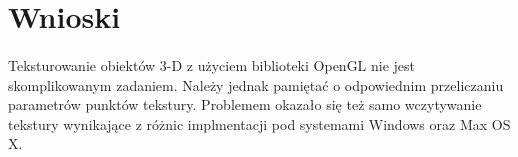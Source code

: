 \documentclass[wide,a4paper,titlepage,12pt] {article}
\begin{document}
  \newpage

  \section{Wnioski}
  \paragraph{}
  Teksturowanie obiektów 3-D z użyciem biblioteki OpenGL nie jest skomplikowanym zadaniem. Należy jednak pamiętać o odpowiednim przeliczaniu parametrów punktów tekstury. Problemem okazało się też samo wczytywanie tekstury wynikające z różnic implmentacji pod systemami Windows oraz Max OS X.
\end{document}
